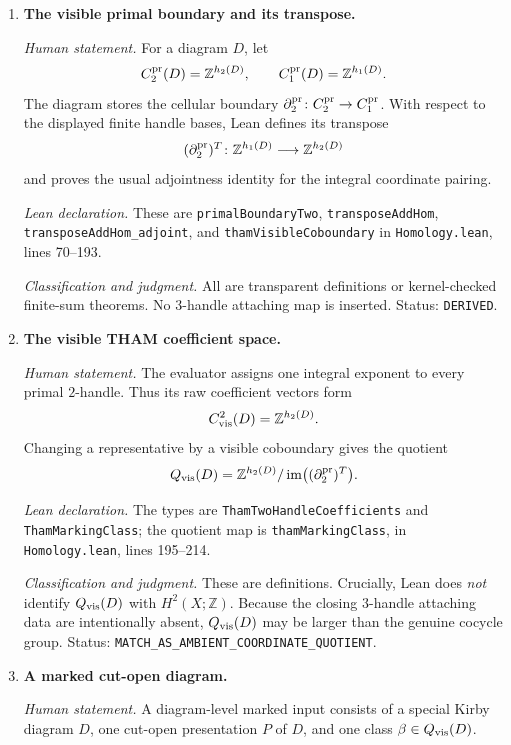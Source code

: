 \begin{enumerate}[label=\textbf{H\arabic*.},leftmargin=*]

\item \textbf{The visible primal boundary and its transpose.}

\emph{Human statement.}
For a diagram $D$, let
\[
 C_2^{\rm pr}(D)=\mathbb Z^{h_2(D)},\qquad
 C_1^{\rm pr}(D)=\mathbb Z^{h_1(D)}.
\]
The diagram stores the cellular boundary
$\partial_2^{\rm pr}\colon C_2^{\rm pr}\to C_1^{\rm pr}$.
With respect to the displayed finite handle bases, Lean defines its transpose
\[
 (\partial_2^{\rm pr})^T\colon
 \mathbb Z^{h_1(D)}\longrightarrow\mathbb Z^{h_2(D)}
\]
and proves the usual adjointness identity for the integral coordinate pairing.

\emph{Lean declaration.}
These are \nolinkurl{primalBoundaryTwo}, \nolinkurl{transposeAddHom},
\nolinkurl{transposeAddHom_adjoint}, and \nolinkurl{thamVisibleCoboundary} in
\nolinkurl{Homology.lean}, lines 70--193.

\emph{Classification and judgment.}
All are transparent definitions or kernel-checked finite-sum theorems.  No
$3$-handle attaching map is inserted.  Status: \texttt{DERIVED}.

\item \textbf{The visible THAM coefficient space.}

\emph{Human statement.}
The evaluator assigns one integral exponent to every primal $2$-handle.  Thus
its raw coefficient vectors form
\[
 C^2_{\rm vis}(D)=\mathbb Z^{h_2(D)}.
\]
Changing a representative by a visible coboundary gives the quotient
\[
 Q_{\rm vis}(D)=
 \mathbb Z^{h_2(D)}/\operatorname{im}\bigl((\partial_2^{\rm pr})^T\bigr).
\]

\emph{Lean declaration.}
The types are \texttt{ThamTwoHandleCoefficients} and
\texttt{ThamMarkingClass}; the quotient map is \texttt{thamMarkingClass}, in
\nolinkurl{Homology.lean}, lines 195--214.

\emph{Classification and judgment.}
These are definitions.  Crucially, Lean does \emph{not} identify
$Q_{\rm vis}(D)$ with $H^2(X;\mathbb Z)$.  Because the closing $3$-handle
attaching data are intentionally absent, $Q_{\rm vis}(D)$ may be larger than
the genuine cocycle group.  Status:
\nolinkurl{MATCH_AS_AMBIENT_COORDINATE_QUOTIENT}.

\item \textbf{A marked cut-open diagram.}

\emph{Human statement.}
A diagram-level marked input consists of a special Kirby diagram $D$, one
cut-open presentation $P$ of $D$, and one class
$\beta\in Q_{\rm vis}(D)$.


\end{enumerate}
